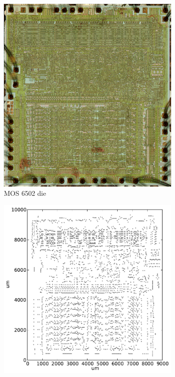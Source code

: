 \documentclass{article}
\begin{document}
\begin{figure}
  \centering 
  \begin{subfigure}[b]{0.43\textwidth}
    \includegraphics[width=\textwidth]{mos6502/6502_shrunk.png}
    \caption{MOS 6502 die}
    \label{fig:mos6502:die}
  \end{subfigure}
  \begin{subfigure}[b]{0.50\textwidth}
    \includegraphics[width=\textwidth]{mos6502/transistors.pdf}

\end{subfigure}
\end{figure}
\end{document}
